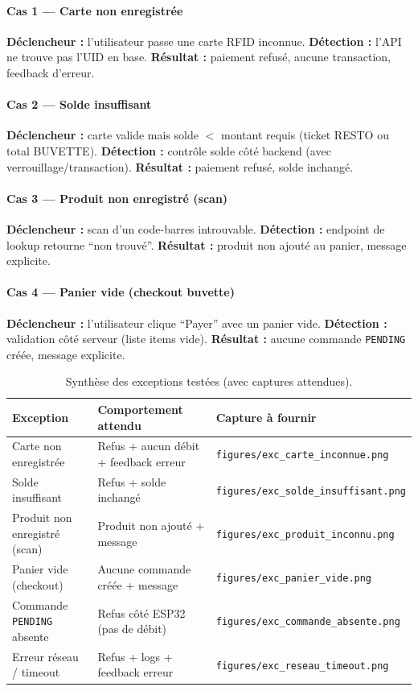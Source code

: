 \documentclass[12pt,a4paper]{report}
\begin{document}
\paragraph{Cas 1 — Carte non enregistrée}
\textbf{Déclencheur :} l’utilisateur passe une carte RFID inconnue. \textbf{Détection :} l’API ne trouve pas l’UID en base. \textbf{Résultat :} paiement refusé, aucune transaction, feedback d’erreur.

\paragraph{Cas 2 — Solde insuffisant}
\textbf{Déclencheur :} carte valide mais solde $<$ montant requis (ticket RESTO ou total BUVETTE). \textbf{Détection :} contrôle solde côté backend (avec verrouillage/transaction). \textbf{Résultat :} paiement refusé, solde inchangé.

\paragraph{Cas 3 — Produit non enregistré (scan)}
\textbf{Déclencheur :} scan d’un code-barres introuvable. \textbf{Détection :} endpoint de lookup retourne “non trouvé”. \textbf{Résultat :} produit non ajouté au panier, message explicite.

\paragraph{Cas 4 — Panier vide (checkout buvette)}
\textbf{Déclencheur :} l’utilisateur clique “Payer” avec un panier vide. \textbf{Détection :} validation côté serveur (liste items vide). \textbf{Résultat :} aucune commande \texttt{PENDING} créée, message explicite.

\begin{table}[H]
\centering
\begin{tabular}{p{} p{} p{}}
\toprule
\textbf{Exception} & \textbf{Comportement attendu} & \textbf{Capture à fournir}\\
\midrule
Carte non enregistrée & Refus + aucun débit + feedback erreur & \texttt{figures/exc\_carte\_inconnue.png}\\
Solde insuffisant & Refus + solde inchangé & \texttt{figures/exc\_solde\_insuffisant.png}\\
Produit non enregistré (scan) & Produit non ajouté + message & \texttt{figures/exc\_produit\_inconnu.png}\\
Panier vide (checkout) & Aucune commande créée + message & \texttt{figures/exc\_panier\_vide.png}\\
Commande \texttt{PENDING} absente & Refus côté ESP32 (pas de débit) & \texttt{figures/exc\_commande\_absente.png}\\
Erreur réseau / timeout & Refus + logs + feedback erreur & \texttt{figures/exc\_reseau\_timeout.png}\\
\bottomrule
\end{tabular}
\caption{Synthèse des exceptions testées (avec captures attendues).}
\end{table}
\end{document}
